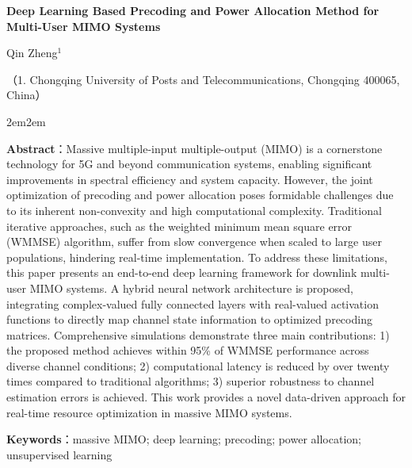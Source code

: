 \documentclass[twoside, 10pt]{ctexart}
\newcommand{\xiaowu}{\fontsize{9pt}{11pt}\selectfont} %
\begin{document}
    \begin{center}
    {\Large \textbf{Deep Learning Based Precoding and Power Allocation Method for Multi-User MIMO Systems}}\par
    \vspace{1em}
    {\large Qin Zheng$^{1}$}\par
    \vspace{0.3em}
    {\small （1. Chongqing University of Posts and Telecommunications, Chongqing 400065, China）}\par
    \vspace{1em}
    \end{center}

    \begin{adjustwidth}{2em}{2em}
    {\xiaowu
    \textbf{Abstract}：Massive multiple-input multiple-output (MIMO) is a cornerstone technology for 5G and beyond communication systems, enabling significant improvements in spectral efficiency and system capacity. However, the joint optimization of precoding and power allocation poses formidable challenges due to its inherent non-convexity and high computational complexity. Traditional iterative approaches, such as the weighted minimum mean square error (WMMSE) algorithm, suffer from slow convergence when scaled to large user populations, hindering real-time implementation. To address these limitations, this paper presents an end-to-end deep learning framework for downlink multi-user MIMO systems. A hybrid neural network architecture is proposed, integrating complex-valued fully connected layers with real-valued activation functions to directly map channel state information to optimized precoding matrices. Comprehensive simulations demonstrate three main contributions: 1) the proposed method achieves within 95\% of WMMSE performance across diverse channel conditions; 2) computational latency is reduced by over twenty times compared to traditional algorithms; 3) superior robustness to channel estimation errors is achieved. This work provides a novel data-driven approach for real-time resource optimization in massive MIMO systems.\par
    \noindent \textbf{Keywords}：massive MIMO; deep learning; precoding; power allocation; unsupervised learning\par
    }
    \end{adjustwidth}
    
    \vspace{4em}
\end{document}

